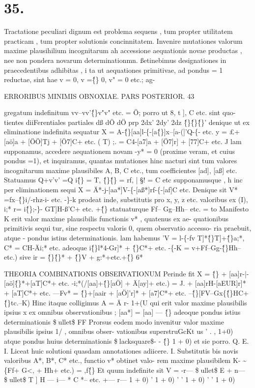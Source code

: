 \documentclass[12pt,a4paper]{article}
\begin{document}
\section*{\textbf{35.}}
Tractatione peculiari dignum est problema sequens , tum propter utilitatem
practicam , tum propter solutionis concinnitatem.
Invenire mutationes valorum maxime plausihilium incognitarum ah accessione
aequationis novae productas , nee non pondera novarum determinationmn.
ßetinebimus designationes in praecedentibus adhibitas , i ta ut aequationes
primitivae, ad pondus = 1 reductae, sint hae v = 0, v =\^\{\} 0, v" = 0 etc.; ag-

\newpage
\begin{center}
\textsc{ERRORIBUS MINIMIS OBNOXIAE. PARS POSTERIOR. 43}
\end{center}
gregatum indefinitum vv--vv'\^\{\}v"v" etc. = Ö; porro ut 8, t ], C etc. sint quo-
tientes diiFerentiales partiales
dß dÖ dÖ
prp
2dx' 2dy' 2dz \^\{\}\^\{\}\^\{\}'
denique ut ex eliminatione indefinita sequatur
X = A-\^\{\}[aa]l-\{-[a\^\{\}]x--[a-(]'Q-\{- etc. 
y = £+[aö]a + [ÖÖ]Tj + [Ö7]C+ etc.  ( T)
;. = C4-[a7]a + [Ö7]r] + [77]C+ etc. J
lam supponamus, accedere aequationem novam -y* = 0 (proxime veram, et cuius
pondus =1), et inquiramus, quantas mutationes hinc nacturi sint tum valores
incognitarum maxime plausibiles A, B, C etc., tum coefficientes [ad], [aß] etc.
Statuamus Q+v'v' =Q i\^\{\} = T, \^\{\}\^\{\} = rf, | \S! = C etc
supponamusque , h inc per eliminationem sequi
X = Ä*-j-[aa*]V-\{-[aß*]rf-\{-[af]C etc.
Denique sit
V* =fx--\^\{\}i/-rhz-i- etc. -\}-k
prodeat inde, substitutis pro x, y, z etc. valoribus ex (I),
i;* r= i\^\{\};-\}- GT]H-ß'C+ etc. +\^\{\}
statuaturque
Ff-- Gg--Hh-- etc. = to
Manifesto K erit valor maxime plausibilis functionis v* , quatenus ex ae-
quationibus primitivis sequi tur, sine respectu valoris 0, quem observatio accesso-
ria praebuit, atque - pondus istius determinationis.
lam habemus
'V = l-\{-fv T]*\^\{\}T]+\^\{\}a;*, C* = CH-Äi;* etc.
adeoque
i\^\{\}l*4-Gr]* + \^\{\}C*+ etc. -\{-K = v+Ff--Gg-\^\{\}Hh-- etc.)
sive ir = \^\{\}\^\{\}* + \^\{\}V + g:*+etc.+\^\{\}
6*

 THEORIA COMBINATIONIS OBSERVATIONUM
Perinde fit
X = \^\{\} + [aa]r-|-[aö]\^\{\}*+[aT]C*+ etc. -i;*(/[aa]+\^\{\}[aÖ] + Ä[ay]+ etc.)
= J. + [aa]rH-[aEUR]r]* + [aT]C*+ etc. ---Fv*
= \^\{\}+[aair + [aÖ]'r]* + [a7]C*+ etc. --\^\{\}[FV--Gx\{\^\{\}HC+\^\{\}tc.--K)
Hinc itaque colligimus
A = Ä r-
1+(U
qui erit valor maxime plausibilis ipsius x ex omnibus observationibus ;
[aa*] = [aa] --- \^\{\}
adeoque pondus istius determinationis \$ullet\$
FF
Prorsus eodem modo invenitur valor maxime plausibilis ipsius 1/ , omnibus obser-
vationibus superstruGcKt us ' . ,
1+0)
atque pondus huius determinationis
\$lacksquare\$- - \^\{\} 1 + 0)
et sie porro. Q. E. I.
Liceat huic solutioni quasdam annotationes adiicere.
I. Substitutis bis novis valoribus A*, B*, C* etc., functio v* obtinet valo-
rem maxime plausibilem
K- \~{}\{Ff+ G<, + Hh+ etc.) = ,f\^\{\}
Et quum indefinite sit
V = -r--- \$ullet\$ E + n--- \$ullet\$ T ] H --- i--- * C *-- etc. +--- r---
1 + 0) ' 1 + 0) ' ' 1 + 0) ' ' 1 + 0)
\end{document}

